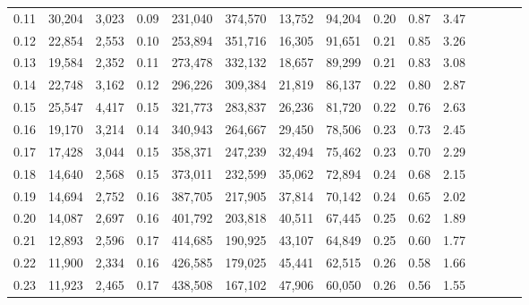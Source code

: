 \begin{tabular}{rrrcrrrrrrrrrrr}
0.11 &  30,204 &  3,023 &                                       0.09 &  231,040 &  374,570 &   13,752 &   94,204 &  0.20 &  0.87 &                         3.47 \\
0.12 &  22,854 &  2,553 &                                       0.10 &  253,894 &  351,716 &   16,305 &   91,651 &  0.21 &  0.85 &                         3.26 \\
0.13 &  19,584 &  2,352 &                                       0.11 &  273,478 &  332,132 &   18,657 &   89,299 &  0.21 &  0.83 &                         3.08 \\
0.14 &  22,748 &  3,162 &                                       0.12 &  296,226 &  309,384 &   21,819 &   86,137 &  0.22 &  0.80 &                         2.87 \\
0.15 &  25,547 &  4,417 &                                       0.15 &  321,773 &  283,837 &   26,236 &   81,720 &  0.22 &  0.76 &                         2.63 \\
0.16 &  19,170 &  3,214 &                                       0.14 &  340,943 &  264,667 &   29,450 &   78,506 &  0.23 &  0.73 &                         2.45 \\
0.17 &  17,428 &  3,044 &                                       0.15 &  358,371 &  247,239 &   32,494 &   75,462 &  0.23 &  0.70 &                         2.29 \\
0.18 &  14,640 &  2,568 &                                       0.15 &  373,011 &  232,599 &   35,062 &   72,894 &  0.24 &  0.68 &                         2.15 \\
0.19 &  14,694 &  2,752 &                                       0.16 &  387,705 &  217,905 &   37,814 &   70,142 &  0.24 &  0.65 &                         2.02 \\
0.20 &  14,087 &  2,697 &                                       0.16 &  401,792 &  203,818 &   40,511 &   67,445 &  0.25 &  0.62 &                         1.89 \\
0.21 &  12,893 &  2,596 &                                       0.17 &  414,685 &  190,925 &   43,107 &   64,849 &  0.25 &  0.60 &                         1.77 \\
0.22 &  11,900 &  2,334 &                                       0.16 &  426,585 &  179,025 &   45,441 &   62,515 &  0.26 &  0.58 &                         1.66 \\
0.23 &  11,923 &  2,465 &                                       0.17 &  438,508 &  167,102 &   47,906 &   60,050 &  0.26 &  0.56 &                         1.55 \\

\end{tabular}
